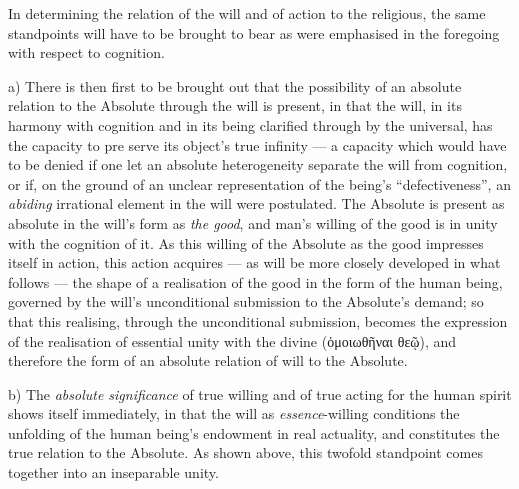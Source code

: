 \documentclass[12pt,a4paper]{book}
\begin{document}
In determining the relation of the will and of action to the religious, the
same standpoints will have to be brought to bear as were emphasised in the
foregoing with respect to cognition.

a) There is then first to be brought out that the possibility of an absolute
relation to the Absolute through the will is present, in that the will, in its
harmony with cognition and in its being clarified through by the universal,
has the capacity to pre\-%
serve its object's true infinity --- a capacity which would have to be denied
if one let an absolute heterogeneity separate the will from cognition, or if,
on the ground of an unclear representation of the being's ``defectiveness'',
an \emph{abiding} irrational element in the will were postulated. The Absolute
is present as absolute in the will's form as \emph{the good}, and man's
willing of the good is in unity with the cognition of it. As this willing of
the Absolute as the good impresses itself in action, this action acquires ---
as will be more closely developed in what follows --- the shape of a
realisation of the good in the form of the human being, governed by the will's
unconditional submission to the Absolute's demand; so that this realising,
through the unconditional submission, becomes the expression of the
realisation of essential unity with the divine (ὁμοιωθῆναι θεῷ), and therefore
the form of an absolute relation of will to the Absolute.

b) The \emph{absolute significance} of true willing and of true acting for the
human spirit shows itself immediately, in that the will as
\emph{essence}-willing conditions the unfolding of the human being's endowment
in real actuality, and constitutes the true relation to the Absolute. As shown
above, this twofold standpoint comes together into an inseparable unity.
\end{document}
